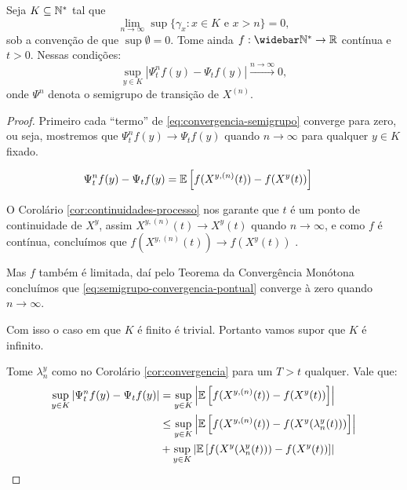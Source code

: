 \begin{proposicao}
  \label{prop:convergencia-semigrupo}
  Seja $K \subseteq {\mathbb{N^*}}$ tal que
  \begin{displaymath}
    \lim_{n \to \infty} \sup\{ \gamma_x: x \in  K \textrm{ e } x > n\} = 0,
  \end{displaymath}
  sob a convenção de que $\sup \emptyset = 0$. Tome ainda $f: \Nzb
  \to \R$ contínua e $t > 0$. Nessas condições:
  \begin{equation}
    \label{eq:convergencia-semigrupo}
    \sup_{y \in K} | \Psi^n_t f (y) - \Psi_t f(y) |
    \xrightarrow{n\to\infty} 0,
  \end{equation}
  onde $\Psi^n$ denota o semigrupo de transição de $X^{(n)}$.
\end{proposicao}

\begin{proof}

  Primeiro cada ``termo'' de \eqref{eq:convergencia-semigrupo}
  converge para zero, ou seja, mostremos que $\Psi^n_t f (y) \to
  \Psi_t f(y)$ quando $n \to \infty$ para qualquer $y \in K$ fixado.

  \begin{align}
    \label{eq:semigrupo-convergencia-pontual}
    \Psi^n_t f (y) -\Psi_t f(y) &=
    {\mathbb{E}} \left[
      f(X^{y, (n)}(t)) - f(X^y(t))
    \right]
  \end{align}

  O Corolário \ref{cor:continuidades-processo} nos garante que $t$ é
  \qc um ponto de continuidade de $X^y$, assim $X^{y, (n)}(t) \to
  X^y(t)$ \qc quando $n \to \infty$, e como $f$ é contínua, concluímos
  que $f(X^{y, (n)}(t)) \to f(X^y(t))$ \qc.

  Mas $f$ também é limitada, daí pelo Teorema da Convergência Monótona
  concluímos que \eqref{eq:semigrupo-convergencia-pontual} converge à
  zero quando $n \to \infty$.

  Com isso o caso em que $K$ é finito é trivial. Portanto vamos supor
  que $K$ é infinito.

  Tome $\lambda_n^y$ como no Corolário \ref{cor:convergencia} para um
  $T > t$ qualquer. Vale que:
  \begin{align}
    \label{eq:esperancas-markov}
    \sup_{y \in K} | \Psi^n_t f (y) - \Psi_t f(y) | 
    &= \sup_{y \in K} \left\lvert {\mathbb{E}} \left[f(X^{y, (n)}(t)) -
        f(X^y(t)) \right]\right\rvert \\
    &\leq \sup_{y\in K}\left\lvert {\mathbb{E}} \left[f(X^{y, (n)}(t)) -
        f(X^y(\lambda_n^y(t))) \right]
    \right\rvert \notag \\
    &+ \sup_{y\in K}\left\lvert {\mathbb{E}} \left[f(X^y(\lambda_n^y(t))) -
        f(X^y(t)) \right] \right\rvert \notag
  \end{align}


\end{proof}
